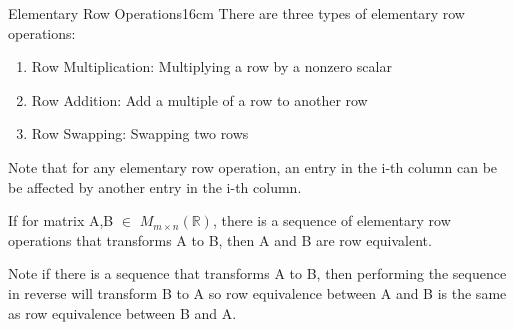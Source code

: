     \begin{definition}{Elementary Row Operations}{16cm}
        There are three types of {\color{lblue} elementary row operations}:

        \begin{enumerate}[label=(\alph*), leftmargin=1cm, itemsep=0.1cm]
            \item {\color{lgreen} Row Multiplication}:
                Multiplying a row by a nonzero scalar
    
            \item {\color{lgreen} Row Addition}:
                Add a multiple of a row to another row

            \item {\color{lgreen} Row Swapping}:
                Swapping two rows
        \end{enumerate}

        Note that for any elementary row operation, an entry in the i-th column
        can be be affected by another entry in the i-th column.

        \vspace{0.3cm}

        If for matrix A,B $\in$ $M_{m \times n}(\mathbb{R})$,
        there is a sequence of elementary row operations that
        transforms A to B, then A and B are {\color{lblue} row equivalent}.

        Note if there is a sequence that transforms A to B,
        then performing the sequence in reverse will transform B to A
        so row equivalence between A and B is the same as
        row equivalence between B and A.
    \end{definition}

    \vspace{0.5cm}



